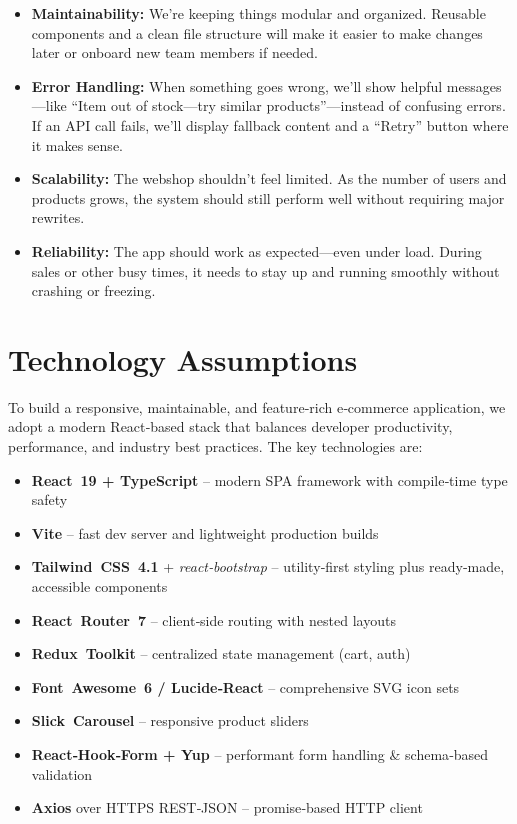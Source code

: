 \documentclass[a4paper,12pt]{article}
\begin{document}
\begin{itemize}
    \item \textbf{Maintainability:}  
    We’re keeping things modular and organized. Reusable components and a clean file structure will make it easier to make changes later or onboard new team members if needed.

    \item \textbf{Error Handling:}  
        When something goes wrong, we’ll show helpful messages—like “Item out of stock—try similar products”—instead of confusing errors. If an API call fails, we’ll display fallback content and a “Retry” button where it makes sense.

    \item \textbf{Scalability:}  
    The webshop shouldn’t feel limited. As the number of users and products grows, the system should still perform well without requiring major rewrites.

    \item \textbf{Reliability:}  
    The app should work as expected—even under load. During sales or other busy times, it needs to stay up and running smoothly without crashing or freezing.
\end{itemize}

\section{Technology Assumptions}

To build a responsive, maintainable, and feature‑rich e‑commerce
application, we adopt a modern React‑based stack that balances developer
productivity, performance, and industry best practices.  
The key technologies are:

\begin{itemize}
	\item \textbf{React 19 + TypeScript} – modern SPA framework with compile‑time type safety
	\item \textbf{Vite} – fast dev server and lightweight production builds
	\item \textbf{Tailwind CSS 4.1} + \textit{react‑bootstrap} – utility‑first styling plus ready‑made, accessible components
	\item \textbf{React Router 7} – client‑side routing with nested layouts
	\item \textbf{Redux Toolkit} – centralized state management (cart, auth)
	\item \textbf{Font Awesome 6 / Lucide‑React} – comprehensive SVG icon sets
	\item \textbf{Slick Carousel} – responsive product sliders
	\item \textbf{React‑Hook‑Form + Yup} – performant form handling \& schema‑based validation
	\item \textbf{Axios} over HTTPS REST‑JSON – promise‑based HTTP client
\end{itemize}
\end{document}
